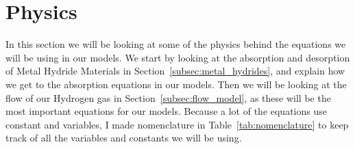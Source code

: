 \section{Physics}\label{sec:physics}

In this section we will be looking at some of the physics behind the equations we will be using in our models. We start by looking at the absorption and desorption of Metal Hydride Materials in Section~\ref{subsec:metal_hydrides}, and explain how we get to the absorption equations in our models. Then we will be looking at the flow of our Hydrogen gas in Section~\ref{subsec:flow_model}, as these will be the most important equations for our models. Because a lot of the equations use constant and variables, I made nomenclature in Table~\ref{tab:nomenclature} to keep track of all the variables and constants we will be using.

